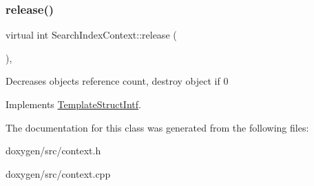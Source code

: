 \mbox{\label{class_search_index_context_a1a1c0cae4a16e4d65a3680027d3b568d}} 
\subsubsection{\texorpdfstring{release()}{release()}}
{\footnotesize\ttfamily virtual int Search\+Index\+Context\+::release (\begin{DoxyParamCaption}{ }\end{DoxyParamCaption})\hspace{0.3cm}{\ttfamily [inline]}, {\ttfamily [virtual]}}

Decreases object\textquotesingle{}s reference count, destroy object if 0 

Implements \mbox{\hyperlink{class_template_struct_intf_a3dce7dd29d3f66a8080b40578e8a5045}{Template\+Struct\+Intf}}.



The documentation for this class was generated from the following files\+:\begin{DoxyCompactItemize}
\item 
doxygen/src/context.\+h\item 
doxygen/src/context.\+cpp\end{DoxyCompactItemize}
